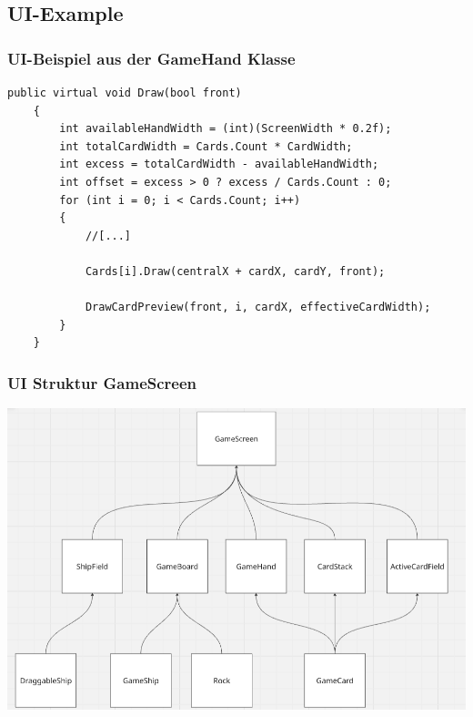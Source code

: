 \documentclass{beamer}
\begin{document}
\subsection{UI-Example}
\begin{frame}[fragile]
  \frametitle{UI-Beispiel aus der GameHand Klasse}
  \begin{lstlisting}[language=CSharp, basicstyle=\ttfamily\tiny, breaklines=true]
    public virtual void Draw(bool front)
    { 
        int availableHandWidth = (int)(ScreenWidth * 0.2f);
        int totalCardWidth = Cards.Count * CardWidth;
        int excess = totalCardWidth - availableHandWidth;
        int offset = excess > 0 ? excess / Cards.Count : 0;
        for (int i = 0; i < Cards.Count; i++)
        {
            //[...]

            Cards[i].Draw(centralX + cardX, cardY, front);

            DrawCardPreview(front, i, cardX, effectiveCardWidth);
        }
    }
  \end{lstlisting}
\end{frame}

\begin{frame}
  \frametitle{UI Struktur GameScreen}
  \includegraphics[width=\textwidth]{UI-Struktur.png}
\end{frame}
\end{document}
